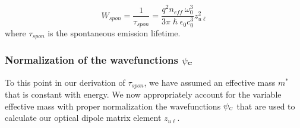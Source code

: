 \documentclass[12pt]{report}
\begin{document}
\begin{equation}
\label{chpt1eqn:tspon}
W_\textit{spon}=\frac{1}{\tau_\textit{spon}}=\frac{q^2 n_\textit{eff} \: \omega_0^3}{3 \pi \hslash \epsilon_0 c_0^3} z_{u\ell}^2
\end{equation}
where $\tau_\textit{spon}$ is the spontaneous emission lifetime.

\subsubsection{Normalization of the wavefunctions $\mathbf{\psi}_{\textnormal{\tiny{\textbf{C}}}}$}

To this point in our derivation of $\tau_\textit{spon}$, we have assumed an effective mass $m^*$ that is constant with energy.  We now appropriately account for the variable effective mass with proper normalization the wavefunctions $\psi_{\textnormal{\tiny{C}}}$ that are used to calculate our optical dipole matrix element $z_{u\ell}$.
\end{document}
